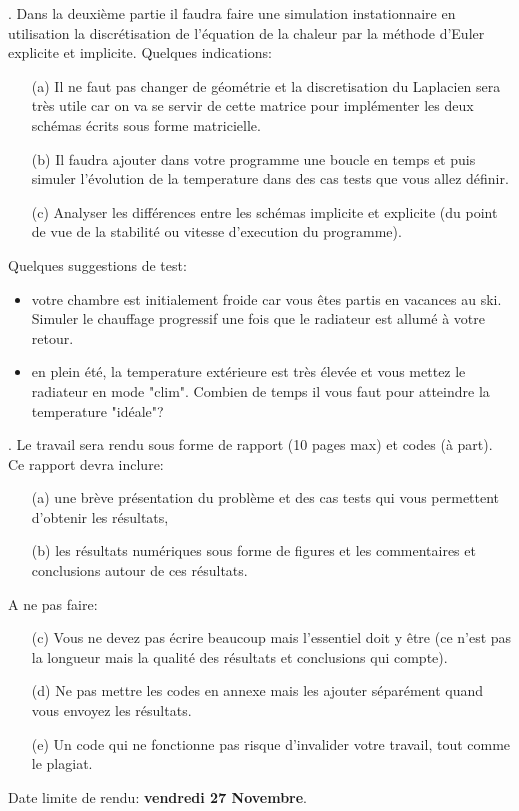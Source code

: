 \documentclass[12pt,a4paper]{article}
\begin{document}
.  Dans la deuxième partie il faudra faire une simulation instationnaire en utilisation la discrétisation de l'équation de la chaleur par la méthode d'Euler explicite et implicite. Quelques indications:
\begin{itemize}
\item[(a)] Il ne faut pas changer de géométrie et la discretisation du Laplacien sera très utile car on va se servir de cette matrice pour implémenter les deux schémas écrits sous forme matricielle.
\item[(b)] Il faudra ajouter dans votre programme une boucle en temps et puis simuler l'évolution de la temperature dans des cas tests que vous allez définir.
\item[(c)] Analyser les différences entre les schémas implicite et explicite (du point de vue de la stabilité ou vitesse d'execution du programme).
\end{itemize}

Quelques suggestions de test:

\begin{itemize}
\item votre chambre est initialement froide car vous êtes partis en vacances au ski. Simuler le chauffage progressif une fois que le radiateur est allumé à votre retour. 
\item en plein été, la temperature extérieure est très élevée et vous mettez le radiateur en mode "clim". Combien de temps il vous faut pour atteindre la temperature "idéale"?
\end{itemize} 


. Le travail sera rendu sous forme de rapport (10 pages max) et codes (à part). Ce rapport devra inclure:
\begin{itemize}
\item[(a)]  une brève présentation du problème et des cas tests qui vous permettent d'obtenir les résultats, 
\item[(b)]  les résultats numériques sous forme de figures et les commentaires et conclusions autour de ces résultats. 
\end{itemize}
A ne pas faire:
\begin{itemize}
\item[(c)]  Vous ne devez pas écrire beaucoup mais l'essentiel doit y être (ce n'est pas la longueur mais la qualité des résultats et conclusions qui compte). 
\item[(d)]  Ne pas mettre les codes en annexe mais les ajouter séparément quand vous envoyez les résultats. 
\item[(e)] Un code qui ne fonctionne pas risque d'invalider votre travail, tout comme le plagiat.
\end{itemize}
Date limite de rendu: {\bf vendredi 27 Novembre}.\\
\end{document}
